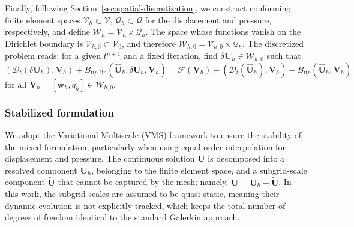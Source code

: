 \documentclass[11pt,english]{article}
\def\disp{\boldsymbol{u}}
\def\SpaceDisp{\boldsymbol{\mathcal{V}}}
\def\SpacePress{\mathcal{Q}}
\def\SpaceTotal{\boldsymbol{\mathcal{W}}}
\def\TestFunctions{\boldsymbol{V}}
\def\UnkVariables{\boldsymbol{U}}
\def\DerBmixedLIN{B_{\disp p, \text{lin}}}
\def\Bmixed{B_{\disp p}}
\begin{document}
    
    Finally, following Section~\ref{sec:spatial-discretization}, we construct conforming finite element spaces $\SpaceDisp_h \subset \SpaceDisp$,  $\SpacePress_h \subset \SpacePress$ for the displacement and pressure, respectively, and define $\SpaceTotal_h=\SpaceDisp_h \times \SpacePress_h$.  
    The space whose functions vanish on the Dirichlet boundary is $\SpaceDisp_{h,0} \subset \SpaceDisp_0$, 
    and therefore $\SpaceTotal_{h,0}=\SpaceDisp_{h,0} \times \SpacePress_h$. 
    The discretized problem reads: for a given $t^{n+1}$ and a fixed iteration, find $\delta \UnkVariables_h \in \SpaceTotal_{h,0}$ such that
    \begin{equation}
        \left(\mathcal{D}_t\left( \delta \UnkVariables_h \right),\TestFunctions_h \right) + \DerBmixedLIN (\hat{\UnkVariables}_h;\delta \UnkVariables_h,\TestFunctions_h) 
        = \mathcal{F}\left(\TestFunctions_h\right)-(\mathcal{D}_t(\hat{\UnkVariables}_h),\TestFunctions_h) -\Bmixed
        (\hat{\UnkVariables}_h,\TestFunctions_h)     
        \label{eq:galerkin_in_compact_form}
    \end{equation}
    for all $\TestFunctions_h = [\boldsymbol{w}_h, q_h] \in \SpaceTotal_{h,0}$.         
    
\subsubsection{Stabilized formulation} \label{subsec:StabilizedFormulation}

    We adopt the Variational Multiscale (VMS) framework to ensure the stability of the mixed formulation, particularly when using equal-order interpolation for displacement and pressure. The continuous solution $\UnkVariables$ is decomposed into a resolved component $\UnkVariables_h$, belonging to the finite element space, and a subgrid-scale component $\tilde{\UnkVariables}$ that cannot be captured by the mesh; namely, $\UnkVariables = \UnkVariables_h + \tilde{\UnkVariables}$. In this work, the subgrid scales are assumed to be quasi-static, meaning their dynamic evolution is not explicitly tracked, which keeps the total number of degrees of freedom identical to the standard Galerkin approach.
    
\end{document}
